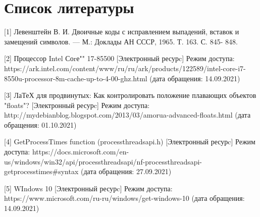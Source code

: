 \documentclass[a4paper,14pt, unknownkeysallowed]{extreport}
\begin{document}
\chapter*{Список литературы}

[1] Левенштейн В. И. Двоичные коды с исправлением выпадений, вставок
и замещений символов. — М.: Доклады АН СССР, 1965. Т. 163. С. 845-
848.

[2] Процессор Intel Соrе"" 17-85500 [Электронный ресурc] Режим доступа: https://ark.intel.com/content/www/ru/ru/ark/products/122589/intel-core-i7-8550u-processor-8m-cache-up-to-4-00-ghz.html
(дата обращения: 14.09.2021)

[3] ЛаТеХ для продвинутых: Как контролировать положение плавающих объектов "floats"? [Электронный ресурc] Режим доступа: http://mydebianblog.blogspot.com/2013/03/amorua-advanced-floats.html (дата обращения: 01.10.2021)

[4] GetProcessTimes function (processthreadsapi.h) [Электронный ресурc] Режим доступа: https://docs.microsoft.com/en-us/windows/win32/api/processthreadsapi/nf-processthreadsapi-getprocesstimes#syntax (дата обращения: 27.09.2021)

[5] WIndows 10 [Электронный ресурc] Режим доступа: https://www.microsoft.com/ru-ru/windows/get-windows-10 (дата обращения: 14.09.2021)
\end{document}
